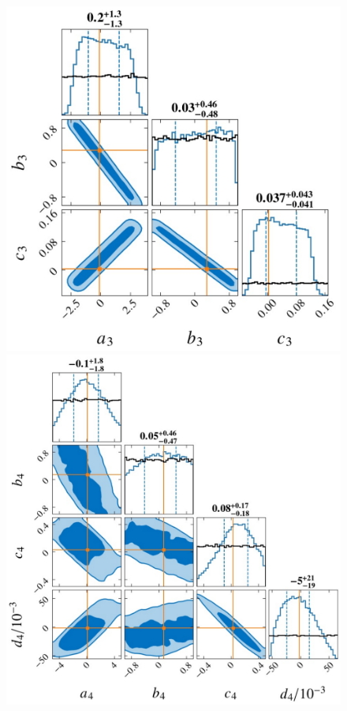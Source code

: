 \documentclass[a4paper,11pt]{article}
\begin{document}
\begin{figure}[t]
    \begin{minipage}[t]{0.49\textwidth}
    \centering
    \includegraphics[width=0.8\linewidth]{Hyper_parameter_3d.pdf}
    \end{minipage}
    \hfill
    \begin{minipage}[t]{0.49\textwidth}
    \centering
    \includegraphics[width=0.8\linewidth]{Hyper_parameter_4d.pdf}
    \end{minipage}
    \vspace{3mm}

\end{figure}
\end{document}
